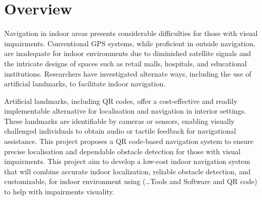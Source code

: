\section{Overview}
Navigation in indoor areas presents considerable difficulties for those with visual impairments. Conventional GPS systems, while proficient in outside navigation, are inadequate for indoor environments due to diminished satellite signals and the intricate designs of spaces such as retail malls, hospitals, and educational institutions. Researchers have investigated alternate ways, including the use of artificial landmarks, to facilitate indoor navigation.

Artificial landmarks, including QR codes, offer a cost-effective and readily implementable alternative for localisation and navigation in interior settings. These landmarks are identifiable by cameras or sensors, enabling visually challenged individuals to obtain audio or tactile feedback for navigational assistance. This project proposes a QR code-based navigation system to ensure precise localisation and dependable obstacle detection for those with visual impairments.
This project aim to develop a low-cost indoor navigation system that will combine accurate indoor localization, reliable obstacle detection, and customizable, for indoor environment using (…Tools and Software and QR code) to help with impairments visuality. 


